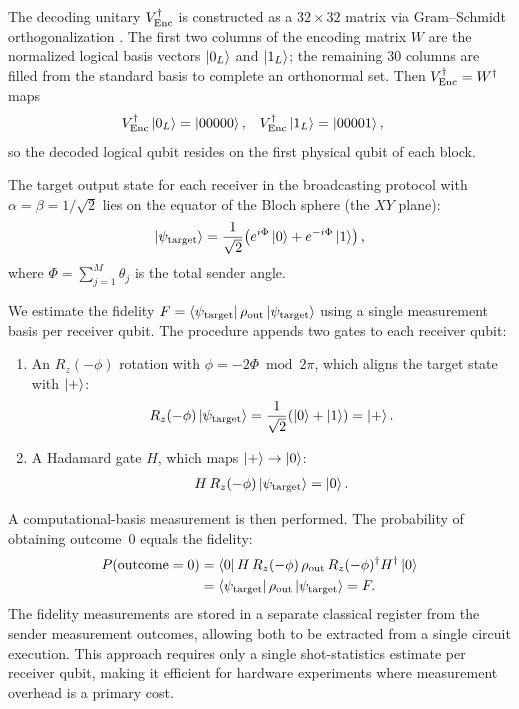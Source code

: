 The decoding unitary $V_{\operatorname{Enc}}^\dagger$ is constructed as a $32\times 32$ matrix via Gram--Schmidt orthogonalization \cite{nielsen2010quantum}. The first two columns of the encoding matrix $W$ are the normalized logical basis vectors $\ket{0_L}$ and $\ket{1_L}$; the remaining 30 columns are filled from the standard basis to complete an orthonormal set. Then $V_{\operatorname{Enc}}^\dagger = W^\dagger$ maps
\begin{align}
V_{\operatorname{Enc}}^\dagger \ket{0_L} &= \ket{00000}, &
V_{\operatorname{Enc}}^\dagger \ket{1_L} &= \ket{00001},
\end{align}
so the decoded logical qubit resides on the first physical qubit of each block.

The target output state for each receiver in the broadcasting protocol with $\alpha=\beta=1/\sqrt{2}$ lies on the equator of the Bloch sphere (the $XY$ plane):
\begin{align}
\ket{\psi_{\mathrm{target}}} = \frac{1}{\sqrt{2}}\!\left(e^{i\Phi}\ket{0} + e^{-i\Phi}\ket{1}\right),
\end{align}
where $\Phi = \sum_{j=1}^{M}\theta_j$ is the total sender angle.

We estimate the fidelity $F = \bra{\psi_{\mathrm{target}}}\rho_{\mathrm{out}}\ket{\psi_{\mathrm{target}}}$ using a single measurement basis per receiver qubit. The procedure appends two gates to each receiver qubit:
\begin{enumerate}
\item An $R_z(-\phi)$ rotation with $\phi = -2\Phi \bmod 2\pi$, which aligns the target state with $\ket{+}$:
\begin{align}
R_z(-\phi)\ket{\psi_{\mathrm{target}}} = \frac{1}{\sqrt{2}}\!\left(\ket{0} + \ket{1}\right) = \ket{+}.
\end{align}
\item A Hadamard gate $H$, which maps $\ket{+}\to\ket{0}$:
\begin{align}
H\,R_z(-\phi)\ket{\psi_{\mathrm{target}}} = \ket{0}.
\end{align}
\end{enumerate}
A computational-basis measurement is then performed. The probability of obtaining outcome~$0$ equals the fidelity:
\begin{align}
P(\text{outcome}=0) &= \bra{0}H\,R_z(-\phi)\,\rho_{\mathrm{out}}\,R_z(-\phi)^\dagger H^\dagger\ket{0} \nonumber \\
&= \bra{\psi_{\mathrm{target}}}\rho_{\mathrm{out}}\ket{\psi_{\mathrm{target}}} = F.
\end{align}
The fidelity measurements are stored in a separate classical register from the sender measurement outcomes, allowing both to be extracted from a single circuit execution. This approach requires only a single shot-statistics estimate per receiver qubit, making it efficient for hardware experiments where measurement overhead is a primary cost.

